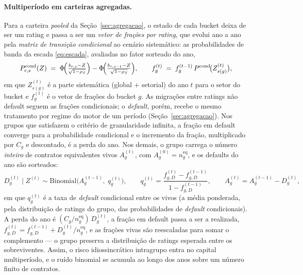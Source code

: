 \documentclass[11pt,a4paper]{article}
\begin{document}
\paragraph{Multiperíodo em carteiras agregadas.} Para a carteira \emph{pooled} da Seção~\ref{sec:agregacao}, o estado de cada bucket deixa de ser um rating e passa a ser um \emph{vetor de frações por rating}, que evolui ano a ano pela \emph{matriz de transição condicional} ao cenário sistemático: as probabilidades de banda da escada \eqref{eq:escada}, avaliadas no fator sorteado do ano,
\begin{equation}
P^{\mathrm{cond}}_{r,s}(Z) \;=\; \Phi\!\Bigl(\tfrac{b_{r,s}-Z}{\sqrt{1-\rho_S}}\Bigr)-\Phi\!\Bigl(\tfrac{b_{r,s-1}-Z}{\sqrt{1-\rho_S}}\Bigr),
\qquad
f^{(t)}_g \;=\; f^{(t-1)}_g\,P^{\mathrm{cond}}\!\bigl(Z^{(t)}_{s(g)}\bigr),
\label{eq:mig-pooled}
\end{equation}
em que $Z^{(t)}_{s(g)}$ é a parte sistemática (global $+$ setorial) do ano $t$ para o setor do bucket e $f^{(t)}_g$ é o vetor de frações do bucket $g$. As migrações entre ratings não default seguem as frações condicionais; o \emph{default}, porém, recebe o mesmo tratamento por regime do motor de um período (Seção~\ref{sec:agregacao}). Nos grupos que satisfazem o critério de granularidade infinita, a fração em default converge para a probabilidade condicional e o incremento da fração, multiplicado por $C_g$ e descontado, é a perda do ano. Nos demais, o grupo carrega o número \emph{inteiro} de contratos equivalentes vivos $A^{(t)}_g$, com $A^{(0)}_g=n^{\mathrm{eq}}_g$, e os defaults do ano são sorteados:
\begin{equation}
D^{(t)}_g\mid Z^{(t)} \sim \mathrm{Binomial}\!\bigl(A^{(t-1)}_g,\; q^{(t)}_g\bigr),
\qquad
q^{(t)}_g=\frac{f^{(t)}_{g,D}-f^{(t-1)}_{g,D}}{1-f^{(t-1)}_{g,D}},
\qquad
A^{(t)}_g=A^{(t-1)}_g-D^{(t)}_g,
\label{eq:mig-binom}
\end{equation}
em que $q^{(t)}_g$ é a taxa de \emph{default} condicional entre os vivos (a média ponderada, pela distribuição de ratings do grupo, das probabilidades de \emph{default} condicionais). A perda do ano é $(C_g/n^{\mathrm{eq}}_g)\,D^{(t)}_g$, a fração em default passa a ser a realizada, $f^{(t)}_{g,D}=f^{(t-1)}_{g,D}+D^{(t)}_g/n^{\mathrm{eq}}_g$, e as frações vivas são reescaladas para somar o complemento --- o grupo preserva a distribuição de ratings esperada entre os sobreviventes. Assim, o risco idiossincrático intragrupo entra no capital multiperíodo, e o ruído binomial se acumula ao longo dos anos sobre um número finito de contratos.
\end{document}
